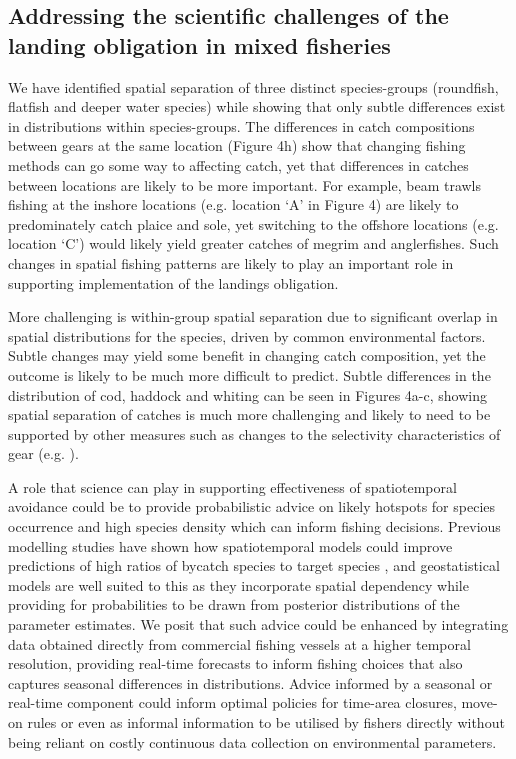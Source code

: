 \documentclass{nature}
\begin{document}
\begin{linenumbers}
\subsection{Addressing the scientific challenges of the landing obligation in
	mixed fisheries}  We have
identified spatial separation of three distinct species-groups (roundfish,
flatfish and deeper water species) while showing that only subtle differences
exist in distributions within species-groups. The differences in catch
compositions between gears at the same location (Figure 4h) show that changing
fishing methods can go some way to affecting catch, yet that differences in
catches between locations are likely to be more important. For example, beam
trawls fishing at the inshore locations (e.g. location `A' in Figure 4) are
likely to predominately catch plaice and sole, yet switching to the offshore
locations (e.g. location `C') would likely yield greater catches of megrim and
anglerfishes.  Such changes in spatial fishing patterns are likely to play an
important role in supporting implementation of the landings obligation.

More challenging is within-group spatial separation due to significant overlap
in spatial distributions for the species, driven by common environmental
factors. Subtle changes may yield some benefit in changing catch composition,
yet the outcome is likely to be much more difficult to predict. 
Subtle differences in the distribution of cod, haddock and whiting can be seen
in Figures 4a-c, showing spatial separation of catches is much more challenging
and likely to need to be supported by other measures such as changes to the
selectivity characteristics of gear (e.g. \cite{Santos2016}). 

A role that science can play in supporting effectiveness of spatiotemporal
avoidance could be to provide probabilistic advice on likely hotspots for
species occurrence and high species density which can inform fishing decisions.
Previous modelling studies have shown how spatiotemporal models could improve
predictions of high ratios of bycatch species to target species \cite{Ward2015,
	Cosandey-Godin2015, Breivik2016}, and geostatistical models are well
suited to this as they incorporate spatial dependency while providing for
probabilities to be drawn from posterior distributions of the parameter
estimates.  We posit that such advice could be enhanced by integrating data
obtained directly from commercial fishing vessels at a higher temporal
resolution, providing real-time forecasts to inform fishing choices that also
captures seasonal differences in distributions.  Advice informed by  a
seasonal or real-time component could inform optimal policies for time-area
closures, move-on rules or even as informal information to be utilised by
fishers directly without being reliant on costly continuous data collection on
environmental parameters.


\end{linenumbers}
\end{document}
